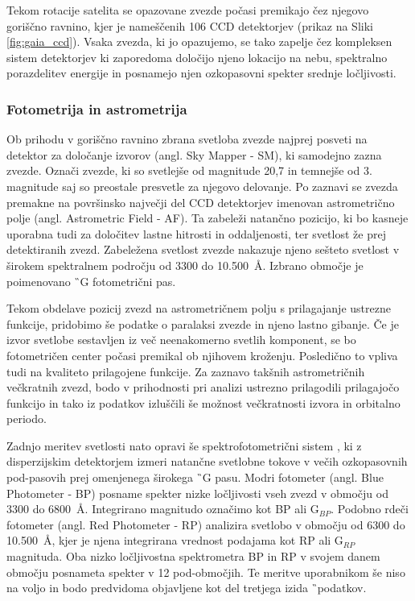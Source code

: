 Tekom rotacije satelita se opazovane zvezde počasi premikajo čez njegovo goriščno ravnino, kjer je nameščenih 106 CCD detektorjev (prikaz na Sliki \ref{fig:gaia_ccd}). Vsaka zvezda, ki jo opazujemo, se tako zapelje čez kompleksen sistem detektorjev ki zaporedoma določijo njeno lokacijo na nebu, spektralno porazdelitev energije in posnamejo njen ozkopasovni spekter srednje ločljivosti.

\subsubsection{Fotometrija in astrometrija}
Ob prihodu v goriščno ravnino zbrana svetloba zvezde najprej posveti na detektor za določanje izvorov (angl. Sky Mapper - SM), ki samodejno zazna zvezde. Označi zvezde, ki so svetlejše od magnitude 20,7 in temnejše od 3. magnitude saj so preostale presvetle za njegovo delovanje. Po zaznavi se zvezda premakne na površinsko največji del CCD detektorjev imenovan astrometrično polje (angl. Astrometric Field - AF). Ta zabeleži natančno pozicijo, ki bo kasneje uporabna tudi za določitev lastne hitrosti in oddaljenosti, ter svetlost že prej detektiranih zvezd. Zabeležena svetlost zvezde nakazuje njeno sešteto svetlost v širokem spektralnem področju od 3300 do 10.500~\AA. Izbrano območje je poimenovano \G\ G fotometrični pas.

Tekom obdelave pozicij zvezd na astrometričnem polju s prilagajanje ustrezne funkcije, pridobimo še podatke o paralaksi zvezde in njeno lastno gibanje. Če je izvor svetlobe sestavljen iz več neenakomerno svetlih komponent, se bo fotometričen center počasi premikal ob njihovem kroženju. Posledično to vpliva tudi na kvaliteto prilagojene funkcije. Za zaznavo takšnih astrometričnih večkratnih zvezd, bodo v prihodnosti pri analizi ustrezno prilagodili prilagajočo funkcijo in tako iz podatkov izluščili še možnost večkratnosti izvora in orbitalno periodo.

Zadnjo meritev svetlosti nato opravi še spektrofotometrični sistem \cite{2018arXiv180409368E}, ki z disperzijskim detektorjem izmeri natančne svetlobne tokove v večih ozkopasovnih pod-pasovih prej omenjenega širokega \G\ G pasu. Modri fotometer (angl. Blue Photometer - BP) posname spekter nizke ločljivosti vseh zvezd v območju od 3300 do 6800~\AA. Integrirano magnitudo označimo kot BP ali G$_{BP}$. Podobno rdeči fotometer (angl. Red Photometer - RP) analizira svetlobo v območju od 6300 do 10.500~\AA, kjer je njena integrirana vrednost podajama kot RP ali G$_{RP}$ magnituda. Oba nizko ločljivostna spektrometra BP in RP v svojem danem območju posnameta spekter v 12 pod-območjih. Te meritve uporabnikom še niso na voljo in bodo predvidoma objavljene kot del tretjega izida \G\ podatkov.

